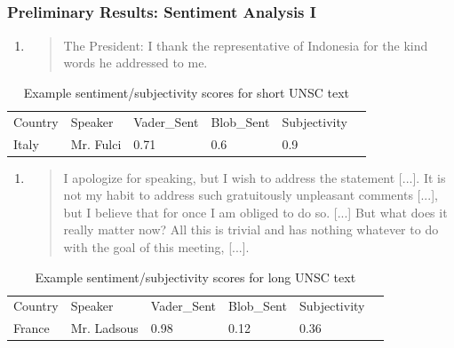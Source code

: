 \documentclass{beamer}
\begin{document}
\subsection{}
\begin{framefont}{\footnotesize}
	\begin{frame}
		\frametitle{Preliminary Results: Sentiment Analysis I}
		\vspace{20pt}
		\begin{enumerate}
		[square]
		    \item
		\begin{quotation}
		    The President: 
		    I thank the representative of Indonesia for the kind words he addressed to me.
		\end{quotation}
		\end{enumerate}
    \begin{table}[]
    \begin{tabular}{|l|l|l|l|l|l}
    \cline{1-5}
    Country & Speaker   & Vader\_Sent & Blob\_Sent & Subjectivity \\ \hhline{|=|=|=|=|=|}
    Italy   & Mr. Fulci     & 0.71           & 0.6                 & 0.9                    \\ \cline{1-5}
    \end{tabular}
    \caption{Example sentiment/subjectivity scores for short UNSC text}
    \end{table}

\begin{enumerate}
[square]
  \setcounter{enumi}{1}
    \item
\begin{quotation}
I apologize for speaking, but I wish to address the
statement [...]. It is not my habit to address such gratuitously
unpleasant comments [...], but I believe that for once I am obliged to do so. [...] But what does it really matter now? All this is trivial and has nothing whatever to do with the goal of this
meeting, [...].
\end{quotation}
\end{enumerate}
    \begin{table}[]
    \begin{tabular}{|l|l|l|l|l|l}
    \cline{1-5}
    Country & Speaker   & Vader\_Sent & Blob\_Sent & Subjectivity \\ \hhline{|=|=|=|=|=|}
    France   & Mr. Ladsous     & 0.98           & 0.12                 & 0.36                    \\ \cline{1-5}
    \end{tabular}
    \caption{Example sentiment/subjectivity scores for long UNSC text}
    \end{table}


	\end{frame}
\end{framefont}
\end{document}
